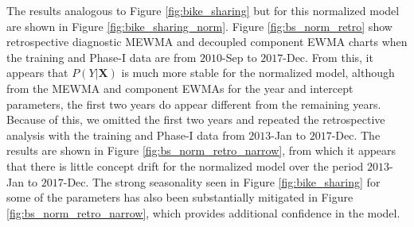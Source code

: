 \documentclass[twoside,11pt]{article}
\begin{document}
The results analogous to Figure \ref{fig:bike_sharing} but for this normalized model are shown in Figure \ref{fig:bike_sharing_norm}. Figure \ref{fig:bs_norm_retro} show retrospective diagnostic MEWMA and decoupled component EWMA charts when the training and Phase-I data are from $2010$-Sep to $2017$-Dec. From this, it appears that $P(Y|\bm{X})$ is much more stable for the normalized model, although from the MEWMA and component EWMAs for the year and intercept parameters, the first two years do appear different from the remaining years. Because of this, we omitted the first two years and repeated the retrospective analysis with the training and Phase-I data from $2013$-Jan to $2017$-Dec. The results are shown in Figure \ref{fig:bs_norm_retro_narrow}, from which it appears that there is little concept drift for the normalized model over the period $2013$-Jan to $2017$-Dec. The strong seasonality seen in Figure \ref{fig:bike_sharing} for some of the parameters has also been substantially mitigated in Figure \ref{fig:bs_norm_retro_narrow}, which provides additional confidence in the model.
\end{document}
